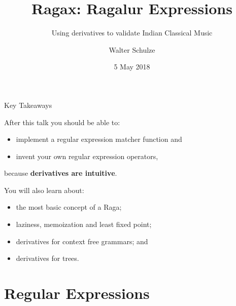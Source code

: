 \documentclass[10pt]{beamer}
\title{Ragax: Ragalur Expressions}
\subtitle{Using derivatives to validate Indian Classical Music}
\date{5 May 2018}
\author{Walter Schulze}
\institute{Amsterdam Functional Programming Meetup}
\begin{document}
\maketitle

\begin{frame}{Key Takeaways}


After this talk you should be able to:
\begin{itemize}
\item implement a regular expression matcher function and
\item invent your own regular expression operators,
\end{itemize}
because \textbf{derivatives are intuitive}.

You will also learn about:
\begin{itemize}
\item the most basic concept of a Raga;
\item laziness, memoization and least fixed point;
\item derivatives for context free grammars; and
\item derivatives for trees.
\end{itemize}

\end{frame}

\section{Regular Expressions}

\end{document}

